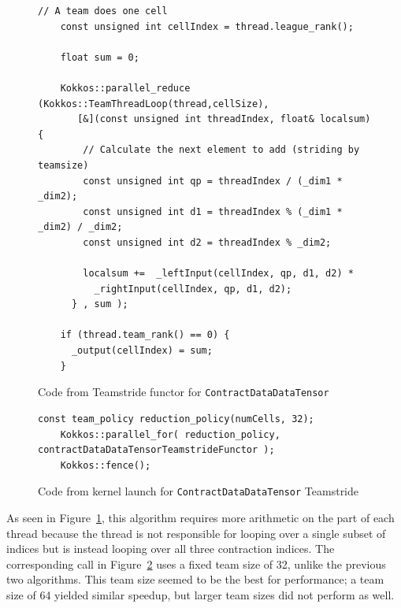 \begin{figure}[ht]
    \begin{lstlisting}[basicstyle=\tiny]
    // A team does one cell
    const unsigned int cellIndex = thread.league_rank();

    float sum = 0;

    Kokkos::parallel_reduce (Kokkos::TeamThreadLoop(thread,cellSize),
       [&](const unsigned int threadIndex, float& localsum) {
        // Calculate the next element to add (striding by teamsize)
        const unsigned int qp = threadIndex / (_dim1 * _dim2);
        const unsigned int d1 = threadIndex % (_dim1 * _dim2) / _dim2;
        const unsigned int d2 = threadIndex % _dim2;
        
        localsum +=  _leftInput(cellIndex, qp, d1, d2) *
          _rightInput(cellIndex, qp, d1, d2);
      } , sum );

    if (thread.team_rank() == 0) {
      _output(cellIndex) = sum;
    }
\end{lstlisting}
\caption{Code from Teamstride functor for \texttt{ContractDataDataTensor}
\label{lst:ContractDataDataTensorTeamstrideFunctor}} 
\end{figure}

\begin{figure}[ht]
    \begin{lstlisting}[basicstyle=\tiny]
    const team_policy reduction_policy(numCells, 32);
    Kokkos::parallel_for( reduction_policy, contractDataDataTensorTeamstrideFunctor );
    Kokkos::fence();
    \end{lstlisting}
\caption{Code from kernel launch for \texttt{ContractDataDataTensor} Teamstride
\label{lst:ContractDataDataTensorTeamstrideCall}} 
\end{figure}

As seen in Figure~\ref{lst:ContractDataDataTensorTeamstrideFunctor}, this
algorithm requires more arithmetic on the part of each thread because the thread
is not responsible for looping over a single subset of indices but is instead
looping over all three contraction indices. The corresponding call in
Figure~\ref{lst:ContractDataDataTensorTeamstrideCall} uses a fixed team size of
32, unlike the previous two algorithms.  This team size seemed to be the best
for performance; a team size of 64 yielded similar speedup, but larger team
sizes did not perform as well.

